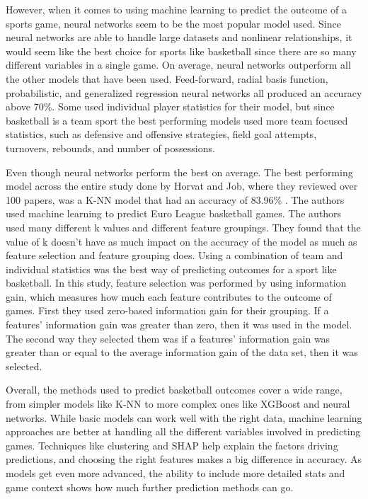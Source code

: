 \documentclass[11pt]{article}
\begin{document}
\medskip

However, when it comes to using machine learning to predict the outcome of a sports game, neural networks seem to be the most popular model used. Since neural networks are able to handle large datasets and nonlinear relationships, it would seem like the best choice for sports like basketball since there are so many different variables in a single game. On average, neural networks outperform all the other models that have been used. Feed-forward, radial basis function, probabilistic, and generalized regression neural networks all produced an accuracy above 70\%. Some used individual player statistics for their model, but since basketball is a team sport the best performing models used more team focused statistics, such as defensive and offensive strategies, field goal attempts, turnovers, rebounds, and number of possessions.\cite{Horvat_Job_2022}

\medskip

Even though neural networks perform the best on average. The best performing model across the entire study done by Horvat and Job, where they reviewed over 100 papers\cite{Horvat_Job_2022}, was a K-NN model that had an accuracy of 83.96\% \cite{Horvat_Job_Medved_2018}. The authors used machine learning to predict Euro League basketball games. The authors used many different k values and different feature groupings. They found that the value of k doesn’t have as much impact on the accuracy of the model as much as feature selection and feature grouping does. Using a combination of team and individual statistics was the best way of predicting outcomes for a sport like basketball. In this study, feature selection was performed by using information gain, which measures how much each feature contributes to the outcome of games. First they used zero-based information gain for their grouping. If a features’ information gain was greater than zero, then it was used in the model. The second way they selected them was if a features’ information gain was greater than or equal to the average information gain of the data set, then it was selected.

\medskip

Overall, the methods used to predict basketball outcomes cover a wide range, from simpler models like K-NN to more complex ones like XGBoost and neural networks. While basic models can work well with the right data, machine learning approaches are better at handling all the different variables involved in predicting games. Techniques like clustering and SHAP help explain the factors driving predictions, and choosing the right features makes a big difference in accuracy. As models get even more advanced, the ability to include more detailed stats and game context shows how much further prediction methods can go.
\end{document}
